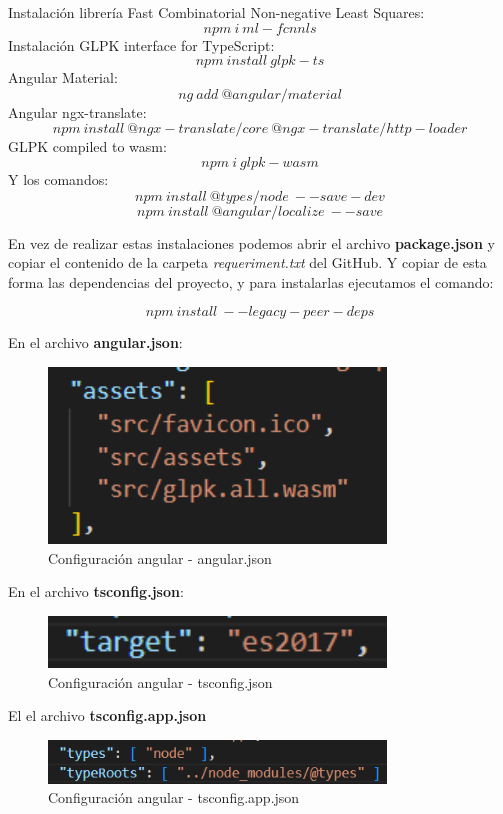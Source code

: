 Instalación librería Fast Combinatorial Non-negative Least Squares:
$$ npm\:i\:ml-fcnnls $$
Instalación GLPK interface for TypeScript:
$$ npm\:install\:glpk-ts $$
Angular Material:
$$ ng\:add\:@angular/material  $$
Angular ngx-translate:
$$ npm\:install\:@ngx-translate/core\:@ngx-translate/http-loader $$
GLPK compiled to wasm:
$$ npm\:i\:glpk-wasm $$
Y los comandos:
$$ npm\:install\:@types/node\:--save-dev $$
$$ npm\:install\:@angular/localize\:--save $$

En vez de realizar estas instalaciones podemos abrir el archivo \textbf{package.json} y copiar el contenido de la carpeta \textit{requeriment.txt} del GitHub. Y copiar de esta forma las dependencias del proyecto, y para instalarlas ejecutamos el comando:

$$ npm\:install\:--legacy-peer-deps $$

En el archivo \textbf{angular.json}: 

\begin{figure}[h!] 
\centering
    \includegraphics[width=0.8\textwidth]{img/angular_json.PNG}
\caption{Configuración angular - angular.json}
\label{fig:angular_json}
\end{figure}

En el archivo \textbf{tsconfig.json}: 

\begin{figure}[h!] 
\centering
    \includegraphics[width=0.8\textwidth]{img/tsconfig_json.PNG}
\caption{Configuración angular - tsconfig.json}
\label{fig:tsconfig_json}
\end{figure}

\newpage
El el archivo \textbf{tsconfig.app.json}

\begin{figure}[h!] 
\centering
    \includegraphics[width=0.8\textwidth]{img/tsconfig_app_json.PNG}
\caption{Configuración angular - tsconfig.app.json}
\label{fig:tsconfig_app_json}
\end{figure}

